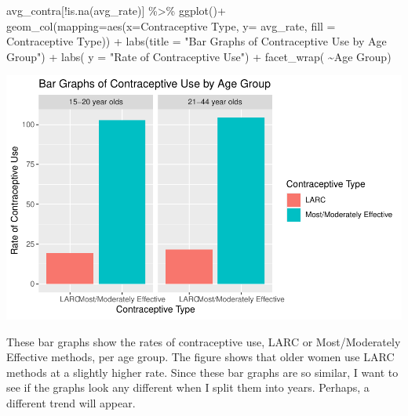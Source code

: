 \documentclass[
]{article}
\newenvironment{Shaded}{\begin{snugshade}}{\end{snugshade}}
\newcommand{\AttributeTok}[1]{\textcolor[rgb]{0.77,0.63,0.00}{#1}}
\newcommand{\FunctionTok}[1]{\textcolor[rgb]{0.00,0.00,0.00}{#1}}
\newcommand{\NormalTok}[1]{#1}
\newcommand{\SpecialCharTok}[1]{\textcolor[rgb]{0.00,0.00,0.00}{#1}}
\newcommand{\StringTok}[1]{\textcolor[rgb]{0.31,0.60,0.02}{#1}}
\begin{document}
\begin{Shaded}
\begin{Highlighting}[]
\NormalTok{avg\_contra[}\SpecialCharTok{!}\FunctionTok{is.na}\NormalTok{(}\StringTok{\textasciigrave{}}\AttributeTok{avg\_rate}\StringTok{\textasciigrave{}}\NormalTok{)] }\SpecialCharTok{\%\textgreater{}\%} 
  \FunctionTok{ggplot}\NormalTok{()}\SpecialCharTok{+}
  \FunctionTok{geom\_col}\NormalTok{(}\AttributeTok{mapping=}\FunctionTok{aes}\NormalTok{(}\AttributeTok{x=}\StringTok{\textasciigrave{}}\AttributeTok{Contraceptive Type}\StringTok{\textasciigrave{}}\NormalTok{, }\AttributeTok{y=} \StringTok{\textasciigrave{}}\AttributeTok{avg\_rate}\StringTok{\textasciigrave{}}\NormalTok{, }\AttributeTok{fill =} \StringTok{\textasciigrave{}}\AttributeTok{Contraceptive Type}\StringTok{\textasciigrave{}}\NormalTok{)) }\SpecialCharTok{+}
   \FunctionTok{labs}\NormalTok{(}\AttributeTok{title =} \StringTok{"Bar Graphs of Contraceptive Use by Age Group"}\NormalTok{) }\SpecialCharTok{+}
  \FunctionTok{labs}\NormalTok{( }\AttributeTok{y =} \StringTok{"Rate of Contraceptive Use"}\NormalTok{) }\SpecialCharTok{+}
    \FunctionTok{facet\_wrap}\NormalTok{( }\SpecialCharTok{\textasciitilde{}}\StringTok{\textasciigrave{}}\AttributeTok{Age Group}\StringTok{\textasciigrave{}}\NormalTok{)}
\end{Highlighting}
\end{Shaded}

\begin{center}\includegraphics[width=700px]{Report_files/figure-latex/unnamed-chunk-6-1} \end{center}

These bar graphs show the rates of contraceptive use, LARC or
Most/Moderately Effective methods, per age group. The figure shows that
older women use LARC methods at a slightly higher rate. Since these bar
graphs are so similar, I want to see if the graphs look any different
when I split them into years. Perhaps, a different trend will appear.
\end{document}
